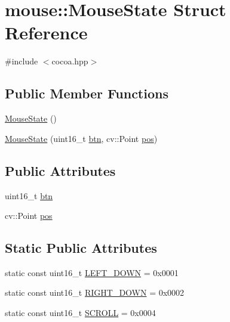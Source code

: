 \hypertarget{structmouse_1_1_mouse_state}{\section{mouse\-:\-:Mouse\-State Struct Reference}
\label{structmouse_1_1_mouse_state}
}


{\ttfamily \#include $<$cocoa.\-hpp$>$}

\subsection*{Public Member Functions}
\begin{DoxyCompactItemize}
\item 
\hyperlink{structmouse_1_1_mouse_state_a0df57029fed62314b2cde044a301e560}{Mouse\-State} ()
\item 
\hyperlink{structmouse_1_1_mouse_state_a0026830ab2d01f9a5cbcf0decf7940a7}{Mouse\-State} (uint16\-\_\-t \hyperlink{structmouse_1_1_mouse_state_ae505c54daeb33d1dd261d68a62ae0814}{btn}, cv\-::\-Point \hyperlink{structmouse_1_1_mouse_state_a7fc14c654b8dda63143c017b86ff6a66}{pos})
\end{DoxyCompactItemize}
\subsection*{Public Attributes}
\begin{DoxyCompactItemize}
\item 
uint16\-\_\-t \hyperlink{structmouse_1_1_mouse_state_ae505c54daeb33d1dd261d68a62ae0814}{btn}
\item 
cv\-::\-Point \hyperlink{structmouse_1_1_mouse_state_a7fc14c654b8dda63143c017b86ff6a66}{pos}
\end{DoxyCompactItemize}
\subsection*{Static Public Attributes}
\begin{DoxyCompactItemize}
\item 
static const uint16\-\_\-t \hyperlink{structmouse_1_1_mouse_state_a9490a7acba9726f815fa3246985da50b}{L\-E\-F\-T\-\_\-\-D\-O\-W\-N} = 0x0001
\item 
static const uint16\-\_\-t \hyperlink{structmouse_1_1_mouse_state_a23bf52536a66f3ca8f3d1cebb0f401ee}{R\-I\-G\-H\-T\-\_\-\-D\-O\-W\-N} = 0x0002
\item 
static const uint16\-\_\-t \hyperlink{structmouse_1_1_mouse_state_a09e8666395882198d1bca0a745f216df}{S\-C\-R\-O\-L\-L} = 0x0004
\end{DoxyCompactItemize}


